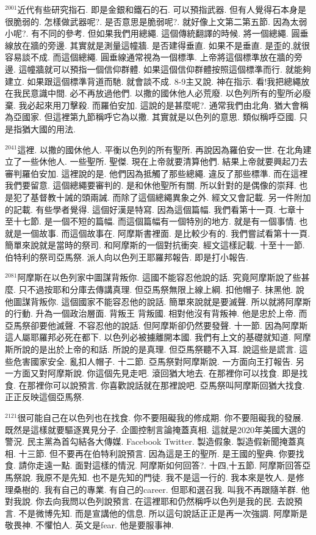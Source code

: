 \documentclass{book}
\begin{document}
$^{2001}$近代有些研究指石.
即是金銀和鐵石的石.
可以預指武器.
但有人覺得石本身是很脆弱的.
怎樣做武器呢?.
是否意思是脆弱呢?.
就好像上文第二第五節.
因為太弱小呢?.
有不同的參考.
但如果我們用總繩.
這個傳統翻譯的時候.
將一個總繩.
圓垂線放在牆的旁邊.
其實就是測量這幢牆.
是否建得垂直.
如果不是垂直.
是歪的,就很容易談不成.
而這個總繩.
圓垂線通常視為一個標準.
上帝將這個標準放在牆的旁邊.
這幢牆就可以預指一個信仰群體.
如果這個信仰群體按照這個標準而行.
就能夠建立.
如果跟這個標準背道而馳.
就會談不成.
8-9主又說.
神在指示.
看!我把總繩放在我民意識中間.
必不再放過他們.
以撒的國休他人必荒廢.
以色列所有的聖所必廢棄.
我必起來用刀擊殺.
而羅伯安加.
這說的是甚麼呢?.
通常我們由北角.
猶大會稱為亞國家.
但這裡第九節稱呼它為以撒.
其實就是以色列的意思.
類似稱呼亞國.
只是指猶大國的用法.

$^{2041}$這裡.
以撒的國休他人.
平衡以色列的所有聖所.
再說因為羅伯安一世.
在北角建立了一些休他人.
一些聖所.
聖傑.
現在上帝就要清算他們.
結果上帝就要興起刀去審判羅伯安加.
這裡說的是.
他們因為抵觸了那些總繩.
違反了那些標準.
而在這裡我們要留意.
這個總繩要審判的.
是和休他聖所有關.
所以針對的是偶像的崇拜.
也是犯了基督教十誡的頭兩誡.
而除了這個總繩異象之外.
經文又會記載.
另一件附加的記載.
有些學者覺得.
這個好漢是特寫.
因為這個篇幅.
我們看第十一頁.
七章十至十七節.
是一個不短的篇幅.
而這個篇幅有一個特別的地方.
就是有一個事情.
也就是一個故事.
而這個故事在.
阿摩斯書裡面.
是比較少有的.
我們嘗試看第十一頁.
簡單來說就是當時的祭司.
和阿摩斯的一個對抗衝突.
經文這樣記載.
十至十一節.
伯特利的祭司亞馬祭.
派人向以色列王耶羅邦報告.
即是打小報告.

$^{2081}$阿摩斯在以色列家中圖謀背叛你.
這國不能容忍他說的話.
究竟阿摩斯說了些甚麼.
只不過按耶和分庫去傳講真理.
但亞馬祭無限上線上綱.
扣他帽子.
抹黑他.
說他圖謀背叛你.
這個國家不能容忍他的說話.
簡單來說就是要滅聲.
所以就將阿摩斯的行動.
升為一個政治層面.
背叛王 背叛國.
相對他沒有背叛神.
他是忠於上帝.
而亞馬祭卻要他滅聲.
不容忍他的說話.
但阿摩斯卻仍然要發聲.
十一節.
因為阿摩斯這人屬耶羅邦必死在都下.
以色列必被擄離開本國.
我們有上文的基礎就知道.
阿摩斯所說的是出於上帝的和話.
所說的是真理.
但亞馬祭聽不入耳.
說這些是謊言.
這些危害國家安全.
亂扣人帽子.
十二節.
亞馬祭對阿摩斯說.
一方面向王打報告.
另一方面又對阿摩斯說.
你這個先見走吧.
滾回猶大地去.
在那裡你可以找食.
即是找食.
在那裡你可以說預言.
你喜歡說話就在那裡說吧.
亞馬祭叫阿摩斯回猶大找食.
正正反映這個亞馬祭.

$^{2121}$很可能自己在以色列也在找食.
你不要阻礙我的修成期.
你不要阻礙我的發展.
既然是這樣就要驅逐異見分子.
企圖控制言論掩蓋真相.
這就是2020年美國大選的警況.
民主黨為首勾結各大傳媒.
Facebook Twitter.
製造假象.
製造假新聞掩蓋真相.
十三節.
但不要再在伯特利說預言.
因為這是王的聖所.
是王國的聖典.
你要找食.
請你走遠一點.
面對這樣的情況.
阿摩斯如何回答?.
十四,十五節.
阿摩斯回答亞馬祭說.
我原不是先知.
也不是先知的門徒.
我不是這一行的.
我本來是牧人.
是修理桑樹的.
我有自己的專業.
有自己的career.
但耶和選召我.
叫我不再跟隨羊群.
他對我說.
你去向我問以色列說預言.
在這裡耶和仍然稱呼以色列是我的民.
去說預言.
不是微博先知.
而是宣講他的信息.
所以這句說話正正是再一次強調.
阿摩斯是敬畏神.
不懼怕人.
英文是fear.
他是要服事神.
\end{document}
